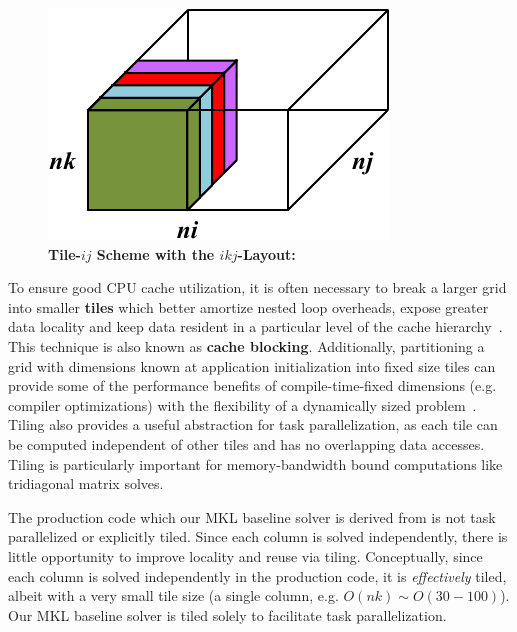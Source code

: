 \documentclass{sig-alternate-05-2015}
\begin{document}
\begin{figure}[!bt]
  \centering
  \label{fig:implementation:tiling:ikj_layout_tile_j}
  \caption{
    \textbf{Tile-\(ij\) Scheme with the \(ikj\)-Layout:} 
  }
  \includegraphics[width=0.95\columnwidth]{figures/ikj_layout_tile_ij_scheme.pdf}
\end{figure}

To ensure good CPU cache utilization, it is often necessary to break a larger
  grid into smaller \textbf{tiles} which better amortize nested loop overheads, expose
  greater data locality and keep data resident in a particular level of the
  cache hierarchy~\cite{blocked_algorithms}.
This technique is also known as \textbf{cache blocking}.
Additionally, partitioning a grid with dimensions known at application
  initialization into fixed size tiles can provide some of the performance
  benefits of compile-time-fixed dimensions (e.g. compiler optimizations) with
  the flexibility of a dynamically sized problem~\cite{kokkos}.
Tiling also provides a useful abstraction for task parallelization, as
  each tile can be computed independent of other tiles and has no overlapping
  data accesses.
Tiling is particularly important for memory-bandwidth bound computations like
  tridiagonal matrix solves.

The production code which our MKL baseline solver is derived from is not task
  parallelized or explicitly tiled.
Since each column is solved independently, there is little opportunity to improve
  locality and reuse via tiling.
Conceptually, since each column is solved independently in the production code,
  it is \emph{effectively} tiled, albeit with a very small tile size (a single
  column, e.g. \(O(nk) \sim O(30-100)\)).
Our MKL baseline solver is tiled solely to facilitate task parallelization.
\end{document}
